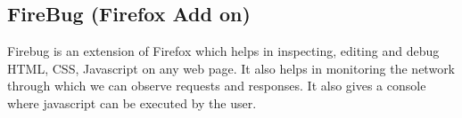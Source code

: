 \subsection{FireBug (Firefox Add on)}
Firebug is an extension of Firefox which helps in inspecting, editing and debug HTML, CSS, Javascript on any web page. It also helps in monitoring the network through which we can observe requests and responses. It also gives a console where javascript can be executed by the user.